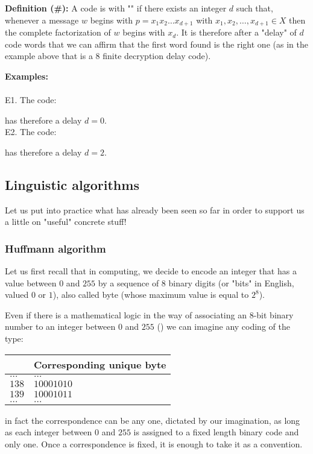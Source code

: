 	\pagebreak
	\textbf{Definition (\#\mydef):} A code is with "" if there exists an integer $d$ such that, whenever a message $w$ begins with $p=x_1x_2\ldots x_{d+1}$ with $x_1,x_2,\ldots, x_{d+1}\in X$ then the complete factorization of $w$ begins with $x_d$. It is therefore after a "delay" of $d$ code words that we can affirm that the first word found is the right one (as in the example above that is a $8$ finite decryption delay code).
	\begin{tcolorbox}[colframe=black,colback=white,sharp corners]
	\textbf{{\Large {}}Examples:}\\\\	
	E1. The code:
	
	has therefore a delay $d=0$.\\

	E2. The code:
	
	has therefore a delay $d=2$.
	\end{tcolorbox}
	
	\subsection{Linguistic algorithms}
	Let us put into practice what has already been seen so far in order to support us a little on "useful" concrete stuff!
	
	\subsubsection{Huffmann algorithm}
	Let us first recall that in computing, we decide to encode an integer that has a value between $0$ and $255$ by a sequence of $8$ binary digits (or "bits" in English, valued $0$ or $1$), also called byte (whose maximum value is equal to $2^8$).
	
	Even if there is a mathematical logic in the way of associating an $8$-bit binary number to an integer between $0$ and $255$ () we can imagine any coding of the type:
	\begin{table}[H]
		\centering
		\begin{tabular}{|l|l|}
		\hline
		\rowcolor[HTML]{9B9B9B} 
		\multicolumn{1}{|c|}{\cellcolor[HTML]{9B9B9B}Integer} & \multicolumn{1}{c|}{\cellcolor[HTML]{9B9B9B}Corresponding unique byte} \\ \hline
		$\ldots$ & $\ldots$ \\ \hline
		$138$ & $10001010$ \\ \hline
		$139$ & $10001011$ \\ \hline
		$\ldots$ & $\ldots$ \\ \hline
		\end{tabular}
	\end{table}
	in fact the correspondence can be any one, dictated by our imagination, as long as each integer between $0$ and $255$ is assigned to a fixed length binary code and only one. Once a correspondence is fixed, it is enough to take it as a convention.
	
